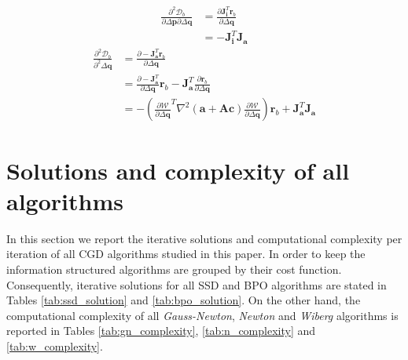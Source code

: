 \begin{equation}
    \begin{aligned}
		\frac{\partial^2 \mathcal{D}_b}{\partial \Delta \mathbf{p} \partial \Delta \mathbf{q}} & =  \frac{\partial \mathbf{J}_{\mathbf{i}}^T \mathbf{r}_b}{\partial \Delta \mathbf{q}}
		\\
		& = -\mathbf{J}_{\mathbf{i}}^T \mathbf{J}_{\mathbf{a}}
    \label{eq:bidirectional_hessian_term5}
    \end{aligned}
\end{equation}
\begin{equation}
    \begin{aligned}
		\frac{\partial^2 \mathcal{D}_b}{\partial^2 \Delta \mathbf{q}} & =  \frac{\partial -\mathbf{J}_{\mathbf{a}}^T \mathbf{r}_b}{\partial \Delta \mathbf{q}}
		\\
		& = \frac{\partial -\mathbf{J}_{\mathbf{a}}^T}{\partial \Delta \mathbf{q}} \mathbf{r}_b - \mathbf{J}_{\mathbf{a}}^T \frac{\partial \mathbf{r}_b}{\partial \Delta \mathbf{q}}
		\\
		& = -\left( \frac{\partial\mathcal{W}}{\partial \Delta \mathbf{q}}^T \nabla^2 (\mathbf{a} + \mathbf{A}\mathbf{c}) \frac{\partial\mathcal{W}}{\partial \Delta \mathbf{q}} \right) \mathbf{r}_b + \mathbf{J}_{\mathbf{a}}^T \mathbf{J}_{\mathbf{a}}
    \label{q:bidirectional_hessian_term6}
    \end{aligned}
\end{equation}


\section{Solutions and complexity of all algorithms}
\label{sec:app2}

In this section we report the iterative solutions and computational complexity per iteration of all CGD algorithms studied in this paper. In order to keep the information structured algorithms are grouped by their cost function. Consequently, iterative solutions for all SSD and BPO algorithms are stated in Tables \ref{tab:ssd_solution} and \ref{tab:bpo_solution}. On the other hand, the computational complexity of all \emph{Gauss-Newton}, \emph{Newton} and \emph{Wiberg} algorithms is reported in Tables \ref{tab:gn_complexity}, \ref{tab:n_complexity} and \ref{tab:w_complexity}.


